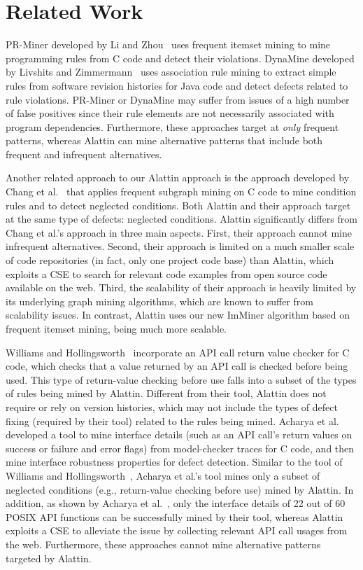 \section{Related Work} 
\label{sec:related}

PR-Miner developed by Li and Zhou~\cite{Zhenmin2005PRMiner} uses frequent itemset mining to mine programming rules from C code and detect their violations. DynaMine developed by Livshits and Zimmermann~\cite{livshits05dynamine} uses
association rule mining to extract simple rules from software revision histories for Java code and detect defects related to rule violations. PR-Miner or DynaMine may suffer from issues of a high number of false positives since their rule elements are not necessarily associated with program dependencies. Furthermore, these approaches target at \emph{only} frequent patterns, whereas Alattin can mine alternative patterns that include both frequent and infrequent alternatives.

Another related approach to our Alattin approach is the approach developed by Chang et al.~\cite{chang07:finding} that applies frequent subgraph mining on C code to mine condition rules and to detect neglected conditions. Both Alattin and their approach target at the same type of defects: neglected conditions. Alattin significantly differs from Chang et al.'s approach in three main aspects. First, their approach cannot mine infrequent alternatives.
Second, their approach is limited on a much smaller scale of code repositories (in fact, only one project code base) than Alattin, which exploits a CSE to search for relevant code examples from open source code available on the web. Third, the
scalability of their approach is heavily limited by its underlying graph mining algorithms, which are known to suffer from scalability issues. In contrast, Alattin uses our new ImMiner algorithm based on frequent itemset mining, being much more scalable.

Williams and Hollingsworth~\cite{Chadd2005rule} incorporate an API call return value checker for C code, which checks that a value returned by an API call is checked before being used. This type of return-value checking before use falls into a subset of the types of rules being mined by Alattin. Different from their tool, Alattin does not require or rely on version histories, which may not include the types of defect fixing (required by their tool) related to the rules being mined. Acharya et al.~\cite{acharya06:mining} developed a tool to mine interface details (such as an API call's return values on success or failure and error flags) from model-checker traces for C code, and then mine interface robustness properties for defect detection. Similar to the tool of Williams and Hollingsworth~\cite{Chadd2005rule}, Acharya et al.'s tool mines only a subset of neglected conditions (e.g., return-value checking before use) mined by Alattin. In addition, as shown by Acharya et al.~\cite{acharya06:mining}, only the interface details of 22 out of 60 POSIX API functions can be successfully mined by their tool, whereas Alattin exploits a CSE to alleviate the issue by collecting relevant API call usages from the web. Furthermore, these approaches cannot mine alternative patterns targeted by Alattin.

